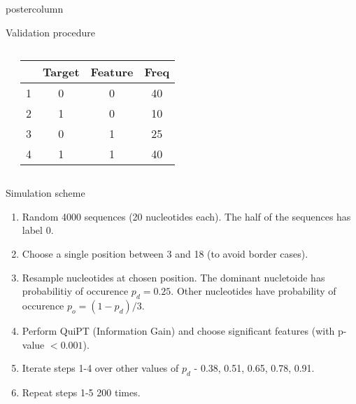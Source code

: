 \documentclass[final]{beamer}\usepackage[]{graphicx}\usepackage[]{color}
\newenvironment{knitrout}{}{} %
\begin{document}
\begin{frame}
\begin{columns}
\begin{column}{.52\textwidth}
\begin{beamercolorbox}[center,wd=\textwidth]{postercolumn}
\begin{minipage}[T]{.95\textwidth}
{\begin{block}{Validation procedure}
\begin{columns}
{\begin{knitrout}
\end{knitrout}
}
\begin{table}[ht]
\centering
\begin{tabular}{|c|ccc|}
  \hline
 & Target & Feature & Freq \\ 
  \hline
1 & 0 & 0 &  40 \\ 
  2 & 1 & 0 &  10 \\ 
  3 & 0 & 1 &  25 \\ 
  4 & 1 & 1 &  40 \\ 
   \hline
\end{tabular}
\end{table}

    \end{columns}
    
    \end{block}
    \vfill
    
% 
% 
% 
% 
% 

\begin{block}{Simulation scheme}
\begin{enumerate}[1.]
\item Random 4000 sequences (20 nucleotides each). The half of the sequences has label 0.
\item Choose a single position between 3 and 18 (to avoid border cases).
\item Resample nucleotides at chosen position. The dominant nucletoide has probabilitiy of occurence $p_d = 0.25$. Other nucleotides have probability of occurence $p_o = (1 - p_d)/3  $. 
\item Perform QuiPT (Information Gain) and choose significant features (with p-value $< 0.001$).
\item Iterate steps 1-4 over other values of $p_d$ - 0.38, 0.51, 0.65, 0.78, 0.91.
\item Repeat steps 1-5 200 times.
\end{enumerate}
    \end{block}
    \vfill

}
\end{minipage}
\end{beamercolorbox}
\end{column}
\end{columns}
\end{frame}
\end{document}
